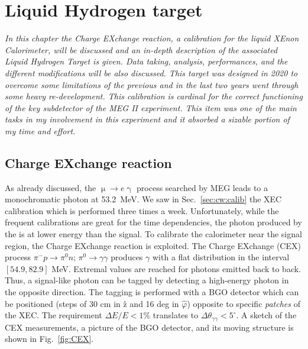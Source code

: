 \chapter{Liquid Hydrogen target}
\label{ch:MEG:CEX}
\begin{refsection}
{\itshape In this chapter the Charge EXchange reaction, a calibration for the liquid XEnon Calorimeter, will be discussed and an in-depth description of the associated Liquid Hydrogen Target is given. 
Data taking, analysis, performances, and the different modifications will be also discussed.
This target was designed in 2020 to overcome some limitations of the previous and in the last two years went through some heavy re-development.
This calibration is cardinal for the correct functioning of the key subdetector of the MEG II experiment. 
This item was one of the main tasks in my involvement in this experiment and it absorbed a sizable portion of my time and effort.}

\section{Charge EXchange reaction}
    As already discussed, the $\upmu \rightarrow e\upgamma$ process searched by MEG leads to a monochromatic photon at \SI{53.2}{MeV}.
    We saw in Sec.~\ref{sec:cw:calib} the XEC calibration which is performed three times a week. 
    Unfortunately, while the frequent calibrations are great for the time dependencies, the photon produced by the  is at lower energy than the signal.
    To calibrate the calorimeter near the signal region, the Charge EXchange reaction is exploited.
    The Charge EXchange (CEX) process $\pi^-p\rightarrow \pi^0n$; $\pi^0\rightarrow\gamma\gamma$ produces $\gamma$ with a flat distribution in the interval $[54.9,82.9]$ MeV.
    Extremal values are reached for photons emitted back to back. Thus, a signal-like photon can be tagged by detecting a high-energy photon in the opposite direction.
    The tagging is performed with a BGO detector which can be positioned (steps of 30 cm in \^{z} and 16 deg in $\hat{\varphi}$) opposite to specific \textit{patches} of the XEC.
    The requirement $\Delta E/E< 1\%$ translates to $\Delta \theta_{\gamma\gamma}<5^\circ$.
    A sketch of the CEX measurements, a picture of the BGO detector, and its moving structure is shown in Fig.~\ref{fig:CEX}.


\end{refsection}

